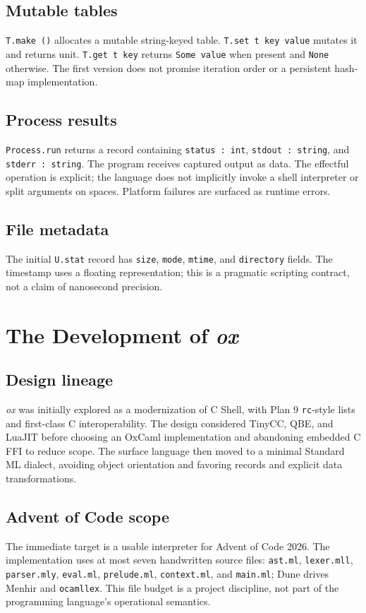 \documentclass[11pt,oneside,openany]{book}
\newcommand{\ox}{\textit{ox}}
\newcommand{\kw}[1]{\texttt{#1}}
\begin{document}
\section{Mutable tables}
\kw{T.make ()} allocates a mutable string-keyed table. \kw{T.set t key value} mutates it and returns unit. \kw{T.get t key} returns \kw{Some value} when present and \kw{None} otherwise. The first version does not promise iteration order or a persistent hash-map implementation.

\section{Process results}
\kw{Process.run} returns a record containing \kw{status : int}, \kw{stdout : string}, and \kw{stderr : string}. The program receives captured output as data. The effectful operation is explicit; the language does not implicitly invoke a shell interpreter or split arguments on spaces. Platform failures are surfaced as runtime errors.

\section{File metadata}
The initial \kw{U.stat} record has \kw{size}, \kw{mode}, \kw{mtime}, and \kw{directory} fields. The timestamp uses a floating representation; this is a pragmatic scripting contract, not a claim of nanosecond precision.

\chapter{The Development of \ox}
\section{Design lineage}
\ox{} was initially explored as a modernization of C Shell, with Plan 9 \kw{rc}-style lists and first-class C interoperability. The design considered TinyCC, QBE, and LuaJIT before choosing an OxCaml implementation and abandoning embedded C FFI to reduce scope. The surface language then moved to a minimal Standard ML dialect, avoiding object orientation and favoring records and explicit data transformations.

\section{Advent of Code scope}
The immediate target is a usable interpreter for Advent of Code 2026. The implementation uses at most seven handwritten source files: \kw{ast.ml}, \kw{lexer.mll}, \kw{parser.mly}, \kw{eval.ml}, \kw{prelude.ml}, \kw{context.ml}, and \kw{main.ml}; Dune drives Menhir and \kw{ocamllex}. This file budget is a project discipline, not part of the programming language's operational semantics.
\end{document}

